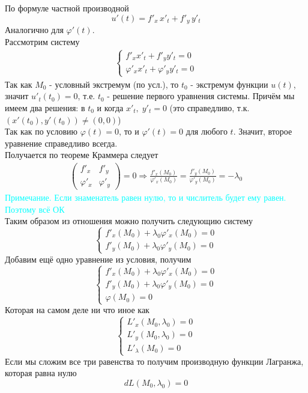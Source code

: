 \begin{Proof}
    По формуле частной производной
    \[
        u'(t) = f'_x\,x'_t+f'_y\,y'_t
    \]
    Аналогично для $\varphi'(t)$.\\
    Рассмотрим систему    
    \begin{align*}
        \begin{cases}
            f'_xx'_t+f'_yy'_t = 0\\
            \varphi'_xx'_t+\varphi'_yy'_t = 0
        \end{cases}
    \end{align*} 
    Так как $M_0$ - условный экстремум (по усл.), то $t_0$ - экстремум функции $u(t)$, значит $u'_t(t_0) = 0$, т.е. $t_0$ - решение первого уравнения системы. Причём мы имеем два решения: в $t_0$ и когда $x'_t,\; y'_t = 0$ (это справедливо, т.к. $(x'(t_0), y'(t_0)) \neq (0, 0)$)\\
    Так как по условию $\varphi(t) = 0$, то и $\varphi'(t) = 0$ для любого $t$. Значит, второе уравнение справедливо всегда.\\
    Получается по теореме Краммера следует
    \begin{gather*}
        \begin{pmatrix}
            f'_x & f'_y\\
            \varphi'_x & \varphi'_y
        \end{pmatrix} = 0 \Rightarrow \frac{f'_x(M_0)}{\varphi'_x(M_0)} = \frac{f'_y(M_0)}{\varphi'_y(M_0)} = -\lambda_0
    \end{gather*}
    \textcolor{cyan}{Примечание. Если знаменатель равен нулю, то и числитель будет ему равен. Поэтому всё ОК}\\
    Таким образом из отношения можно получить следующию систему
    \[
        \begin{cases}
            f'_x(M_0) + \lambda_0\varphi'_x(M_0) = 0\\
            f'_y(M_0) + \lambda_0\varphi'_y(M_0) = 0
        \end{cases}
    \]
    Добавим ещё одно уравнение из условия, получим
    \[
        \begin{cases}
            f'_x(M_0) + \lambda_0\varphi'_x(M_0) = 0\\
            f'_y(M_0) + \lambda_0\varphi'_y(M_0) = 0\\
            \varphi(M_0) = 0
        \end{cases}
    \]
    Которая на самом деле ни что иное как
    \[
        \begin{cases}
            L'_x(M_0, \lambda_0) = 0\\
            L'_y(M_0, \lambda_0) = 0\\
            L'_\lambda(M_0) = 0
        \end{cases}
    \]
    Если мы сложим все три равенства то получим производную функции Лагранжа, которая равна нулю
    \[
        dL(M_0, \lambda_0) = 0
    \]
\end{Proof}

